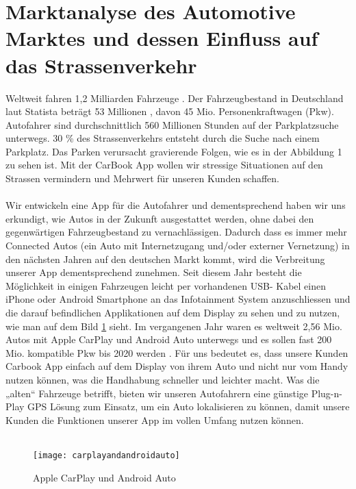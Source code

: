 \documentclass[12pt,ngerman, fleqn]{book} %
\begin{document}
\section{Marktanalyse des Automotive Marktes und dessen Einfluss auf das Strassenverkehr} 

Weltweit fahren 1,2 Milliarden Fahrzeuge \autocite{greencarreports}. Der Fahrzeugbestand in Deutschland laut Statista beträgt 53 Millionen \autocite{statista1}, davon 45 Mio. Personenkraftwagen \autocite{statista2} (Pkw). Autofahrer sind durchschnittlich 560 Millionen Stunden auf der Parkplatzsuche unterwegs\autocite{welt1}. 30 \% des Strassenverkehrs entsteht durch die Suche nach einem Parkplatz\autocite{apcoa, forbes}. Das Parken verursacht gravierende Folgen, wie es in der Abbildung 1 zu sehen ist. Mit der CarBook App wollen wir stressige Situationen auf den Strassen vermindern und Mehrwert für unseren Kunden schaffen. \\ \\
Wir entwickeln eine App für die Autofahrer und dementsprechend haben wir uns erkundigt, wie Autos in der Zukunft ausgestattet werden, ohne dabei den gegenwärtigen Fahrzeugbestand zu vernachlässigen. Dadurch dass es immer mehr Connected Autos (ein Auto mit Internetzugang und/oder externer Vernetzung) in den nächsten Jahren auf den deutschen Markt kommt, wird die Verbreitung unserer App dementsprechend zunehmen. Seit diesem Jahr besteht die Möglichkeit in einigen Fahrzeugen leicht per vorhandenen USB- Kabel einen iPhone oder Android Smartphone an das Infotainment System anzuschliessen und die darauf befindlichen Applikationen auf dem Display zu sehen und zu nutzen, wie man auf dem Bild \ref{fig:carplayandandroidauto} sieht. Im vergangenen Jahr waren es weltweit  2,56 Mio. Autos mit Apple CarPlay und Android Auto unterwegs und es sollen fast 200 Mio. kompatible Pkw  bis 2020 werden \autocite{welt2}. Für uns bedeutet es, dass unsere Kunden Carbook App einfach auf dem Display von ihrem Auto und nicht nur vom Handy nutzen können, was die Handhabung schneller und leichter macht. Was die „alten“ Fahrzeuge betrifft, bieten wir unseren Autofahrern eine günstige Plug-n-Play GPS Lösung zum Einsatz, um ein Auto lokalisieren zu können, damit unsere Kunden die Funktionen unserer App im vollen Umfang nutzen können. \\ \\
\linebreak
\begin{figure}[ht]
    \centering
    \texttt{[image: carplayandandroidauto]}
    \caption{Apple CarPlay und Android Auto}
    \label{fig:carplayandandroidauto}
\end{figure} \linebreak
\end{document}

